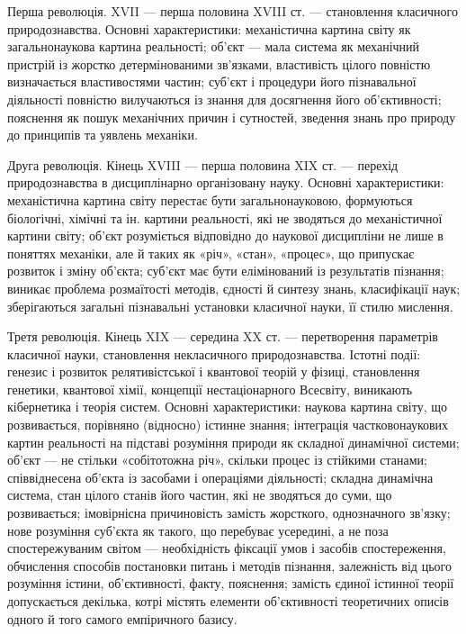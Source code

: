 Перша революція. XVII --- перша половина XVIII ст. --- становлення
класичного природознавства. Основні характеристики: механістична картина
світу як загальнонаукова картина реальності; об’єкт --- мала система як
механічний пристрій із жорстко детермінованими зв’язками, властивість цілого
повністю визначається властивостями частин; суб’єкт і процедури його
пізнавальної діяльності повністю вилучаються із знання для досягнення його
об’єктивності; пояснення як пошук механічних причин і сутностей, зведення
знань про природу до принципів та уявлень механіки.

Друга революція. Кінець XVIII --- перша половина XIX ст. --- перехід
природознавства в дисциплінарно організовану науку. Основні характеристики:
механістична картина світу перестає бути загальнонауковою, формуються
біологічні, хімічні та ін. картини реальності, які не зводяться до механістичної
картини світу; об’єкт розуміється відповідно до наукової дисципліни не лише в
поняттях механіки, але й таких як «річ», «стан», «процес», що припускає
розвиток і зміну об’єкта; суб’єкт має бути елімінований із результатів пізнання;
виникає проблема розмаїтості методів, єдності й синтезу знань, класифікації
наук; зберігаються загальні пізнавальні установки класичної науки, її стилю
мислення.

Третя революція. Кінець XIX --- середина XX ст. --- перетворення параметрів
класичної науки, становлення некласичного природознавства. Істотні події:
генезис і розвиток релятивістської і квантової теорій у фізиці, становлення
генетики, квантової хімії, концепції нестаціонарного Всесвіту, виникають
кібернетика і теорія систем. Основні характеристики: наукова картина світу, що
розвивається, порівняно (відносно) істинне знання; інтеграція
частковонаукових картин реальності на підставі розуміння природи як складної
динамічної системи; об’єкт --- не стільки «собітотожна річ», скільки процес із
стійкими станами; співвіднесена об’єкта із засобами і операціями діяльності;
складна динамічна система, стан цілого станів його частин, які не зводяться до
суми, що розвивається; імовірнісна причиновість замість жорсткого,
однозначного зв’язку; нове розуміння суб’єкта як такого, що перебуває
усередині, а не поза спостережуваним світом --- необхідність фіксації умов і
засобів спостереження, обчислення способів постановки питань і методів
пізнання, залежність від цього розуміння істини, об’єктивності, факту,
пояснення; замість єдиної істинної теорії допускається декілька, котрі містять
елементи об’єктивності теоретичних описів одного й того самого емпіричного
базису.

